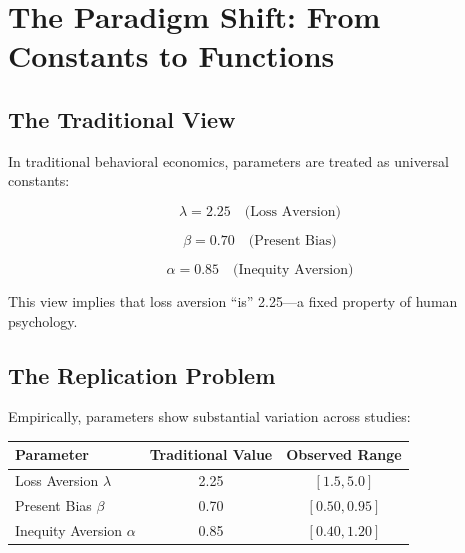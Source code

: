 
\section{The Paradigm Shift: From Constants to Functions}
\label{sec:pct-paradigm}

\subsection{The Traditional View}

In traditional behavioral economics, parameters are treated as universal constants:

\begin{equation}
\lambda = 2.25 \quad \text{(Loss Aversion)}
\end{equation}

\begin{equation}
\beta = 0.70 \quad \text{(Present Bias)}
\end{equation}

\begin{equation}
\alpha = 0.85 \quad \text{(Inequity Aversion)}
\end{equation}

This view implies that loss aversion ``is'' 2.25---a fixed property of human psychology.

\subsection{The Replication Problem}

Empirically, parameters show substantial variation across studies:

\begin{center}
\begin{tabular}{lcc}
\toprule
\textbf{Parameter} & \textbf{Traditional Value} & \textbf{Observed Range} \\
\midrule
Loss Aversion $\lambda$ & 2.25 & $[1.5, 5.0]$ \\
Present Bias $\beta$ & 0.70 & $[0.50, 0.95]$ \\
Inequity Aversion $\alpha$ & 0.85 & $[0.40, 1.20]$ \\
\bottomrule
\end{tabular}
\end{center}

